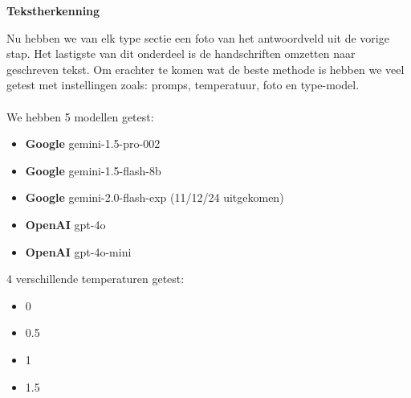 \documentclass[12pt]{article}
\begin{document}
\noindent
\textbf{Tekstherkenning}
\begin{multicols}{2}
Nu hebben we van elk type sectie een foto van het antwoordveld uit de vorige stap. Het lastigste van dit onderdeel is de handschriften omzetten naar geschreven tekst. Om erachter te komen wat de beste methode is hebben we veel getest met instellingen zoals: promps, temperatuur, foto en type-model.\\
\\
We hebben 5 modellen getest:
\begin{itemize}
    \item \textbf{Google} gemini-1.5-pro-002
    \item \textbf{Google} gemini-1.5-flash-8b
    \item \textbf{Google} gemini-2.0-flash-exp (11/12/24 uitgekomen)
    \item \textbf{OpenAI} gpt-4o
    \item \textbf{OpenAI} gpt-4o-mini
\end{itemize}

4 verschillende temperaturen getest:
\begin{itemize}
    \item 0
    \item 0.5
    \item 1
    \item 1.5
\end{itemize}
\end{multicols}
\pagebreak
\end{document}
